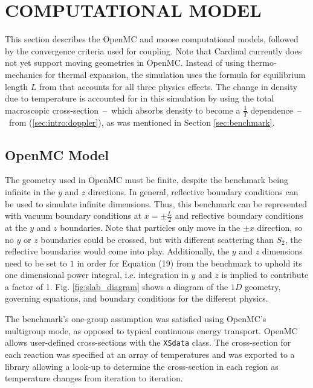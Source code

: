 \documentclass[letterpaper]{mc2023}
\begin{document}
\section{COMPUTATIONAL MODEL}
\label{sec:model}
This section describes the OpenMC and \gls{moose} computational models, followed by the convergence criteria used for coupling.
Note that Cardinal currently does not yet support moving geometries in OpenMC. Instead of using thermo-mechanics for thermal
expansion, the simulation uses the formula for equilibrium length $L$ from \cite{analytical_benchmark} that accounts for all
three physics effects. The change in density due to temperature is accounted for in this simulation by using the total macroscopic
cross-section\ --\ which absorbs density to become a $\frac{1}{T}$ dependence\ --\ from (\ref{sec:intro:doppler}), as was
mentioned in Section \ref{sec:benchmark}.

\subsection{OpenMC Model}
The geometry used in OpenMC must be finite, despite the benchmark being infinite in the $y$ and $z$ directions. In general,
reflective boundary conditions can be used to simulate infinite dimensions. Thus, this benchmark can be represented with
vacuum boundary conditions at $x=\pm \frac{L}{2}$ and reflective boundary conditions at the $y$ and $z$ boundaries. Note that
particles only move in the $\pm x$ direction, so no $y$ or $z$ boundaries could be crossed, but with different scattering than
$S_{2}$, the reflective boundaries would come into play. Additionally, the $y$ and $z$ dimensions need to be set to $1$
in order for Equation (19) from the benchmark to uphold its one dimensional power integral, i.e. integration in $y$ and $z$ is
implied to contribute a factor of 1. \cite{analytical_benchmark} Fig. \ref{fig:slab_diagram} shows a diagram of the $1D$ geometry,
governing equations, and boundary conditions for the different physics.

The benchmark's one-group assumption was satisfied using OpenMC's multigroup mode, as opposed to typical continuous energy
transport. OpenMC allows user-defined cross-sections with the \texttt{XSdata} class. The cross-section for each reaction was
specified at an array of temperatures and was exported to a library allowing a look-up to determine the cross-section in each
region as temperature changes from iteration to iteration.
\end{document}
